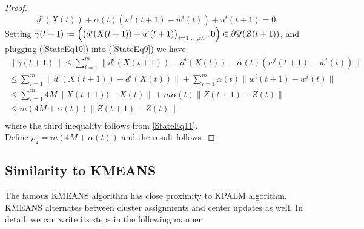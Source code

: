 \documentclass[11pt]{article}
\numberwithin{equation}{section}
\begin{document}
\begin{proof}
\begin{equation}
	d^i(X(t)) + \alpha(t) \left( w^i(t+1) - w^i(t) \right) + u^i(t+1) = 0 . \label{StateEq10}
\end{equation}
Setting $\gamma(t+1) := \left( \left( d^i(X(t+1)) + u^i(t+1) \right)_{i=1, \ldots ,m}, \bf{0} \right) \in \partial \Psi(Z(t+1))$, and plugging (\ref{StateEq10}) into (\ref{StateEq9}) we have
\begin{equation*}
	\begin{split}
	\| \gamma(t+1) \|
	\leq \sum\limits_{i=1}^{m} \| d^i(X(t+1)) - d^i(X(t)) - \alpha(t) \left( w^i(t+1) - w^i(t) \right) \| \\
	\leq \sum\limits_{i=1}^{m} \| d^i(X(t+1)) - d^i(X(t)) \| + \sum\limits_{i=1}^{m} \alpha(t) \| w^i(t+1) - w^i(t) \| \\
	\leq \sum\limits_{i=1}^{m} 4M \| X(t+1)) - X(t) \| + m \alpha(t) \|Z(t+1) - Z(t)\| \\
	\leq m \left( 4M + \alpha(t) \right) \|Z(t+1) - Z(t)\| \\
	\end{split}
\end{equation*}
where the third inequality follows from \cref{StateEq11}. \\
Define $\rho_2 = m \left( 4M + \alpha(t) \right)$ and the result follows.
\end{proof}

\newpage

\subsection{Similarity to KMEANS}
The famous KMEANS algorithm has close proximity to KPALM algorithm. KMEANS alternates between cluster assignments and center updates as well. In detail, we can write its steps in the following manner
\end{document}
